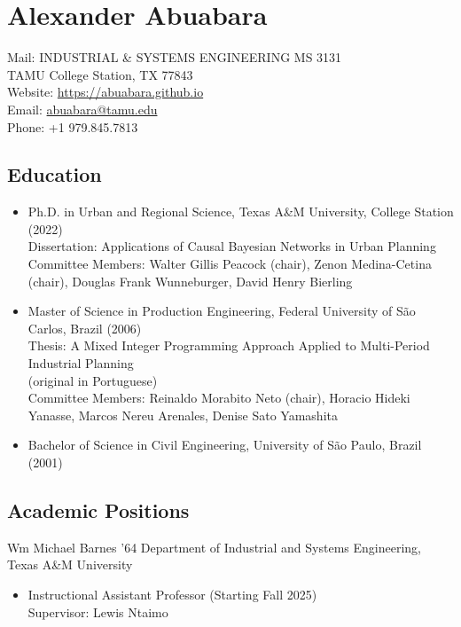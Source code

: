 \documentclass[11pt,oneside]{article}
\begin{document}
\pagestyle{firstpage}
\raggedright

\section*{Alexander Abuabara}
Mail: INDUSTRIAL \& SYSTEMS ENGINEERING MS 3131\\
\hspace{0.9cm} TAMU College Station, TX 77843\\[1pt]
Website: \url{https://abuabara.github.io}\\[1pt]
Email: \href{abuabara@tamu.edu}{abuabara@tamu.edu}\\[1pt]
Phone: +1 979.845.7813

\subsection*{Education}
\begin{itemize}[leftmargin=20pt]
\item Ph.D. in Urban and Regional Science, Texas A\&M University, College Station (2022)\\[1pt]
      Dissertation: Applications of Causal Bayesian Networks in Urban Planning\\[1pt]
      Committee Members: Walter Gillis Peacock (chair), Zenon Medina-Cetina (chair), Douglas Frank Wunneburger, David Henry Bierling
\item Master of Science in Production Engineering, Federal University of São Carlos, Brazil (2006)\\[1pt]
      Thesis: A Mixed Integer Programming Approach Applied to Multi-Period Industrial Planning\\[0pt]
      {\small (original in Portuguese)}\\[1pt]
      Committee Members: Reinaldo Morabito Neto (chair), Horacio Hideki Yanasse, Marcos Nereu Arenales, Denise Sato Yamashita
\item Bachelor of Science in Civil Engineering, University of São Paulo, Brazil (2001)
\end{itemize}

\subsection*{Academic Positions}
{Wm Michael Barnes ’64 Department of Industrial and Systems Engineering, Texas A\&M University}
\begin{itemize}[leftmargin=20pt]
\item Instructional Assistant Professor (Starting Fall 2025)\\
      Supervisor: Lewis Ntaimo
\end{itemize}
\end{document}
